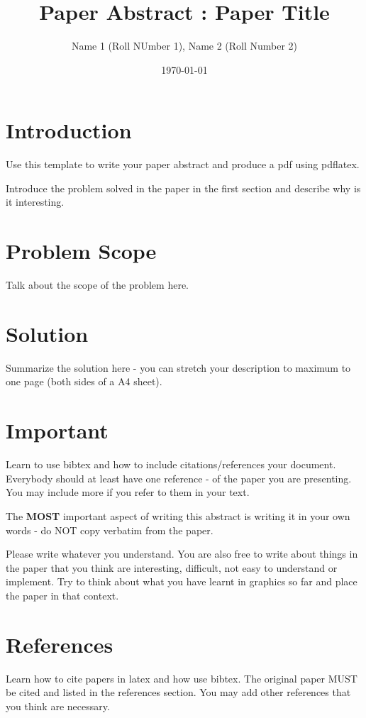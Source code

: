 \documentclass[a4paper,11pt,twocolumn]{article}
\title{ Paper Abstract : Paper Title}
\author{Name 1 (Roll NUmber 1), Name 2 (Roll Number 2)}
\date{\today}
\begin{document}
\maketitle

\section{Introduction}
Use this template to write your paper abstract and produce a pdf using
pdflatex.

Introduce the problem solved in the paper in the first section and
describe why is it interesting.

\section{Problem Scope}
Talk about the scope of the problem here.

\section{Solution}
Summarize the solution here - you can stretch your description to
maximum to one page (both sides of a A4 sheet).

\section{Important}
Learn to use bibtex and how to include citations/references your
document. Everybody should at least have one reference - of the paper
you are presenting. You may include more if you refer to them in your
text.

The \textbf{MOST} important aspect of writing this abstract is writing
it in your own words - do NOT copy verbatim from the paper. 

Please write whatever you understand. You are also free to write about
things in the paper that you think are interesting, difficult, not
easy to understand or implement. Try to think about what you have
learnt in graphics so far and place the paper in that context.

\section{References}
Learn how to cite papers in latex and how use bibtex. The original paper MUST be cited and listed in the references section. You may add other references that you think are necessary.
\end{document}
